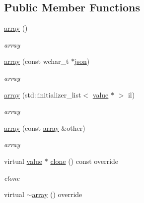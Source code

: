 \subsection*{Public Member Functions}
\begin{DoxyCompactItemize}
\item 
\hyperlink{classformat_1_1array_ab5ea2ac00086dd223936b1d18aef29fd}{array} ()\hypertarget{classformat_1_1array_ab5ea2ac00086dd223936b1d18aef29fd}{}\label{classformat_1_1array_ab5ea2ac00086dd223936b1d18aef29fd}

\begin{DoxyCompactList}\small\item\em array \end{DoxyCompactList}\item 
\hyperlink{classformat_1_1array_a17817a681d45278e357b4b0cabef3316}{array} (const wchar\+\_\+t $\ast$\hyperlink{classformat_1_1json}{json})
\begin{DoxyCompactList}\small\item\em array \end{DoxyCompactList}\item 
\hyperlink{classformat_1_1array_a305e57c21dfe05d3485a4b35d9123f73}{array} (std\+::initializer\+\_\+list$<$ \hyperlink{classformat_1_1value_aa6b85823936bf7b8ab78d3f8d443c00d}{value} $\ast$ $>$ il)
\begin{DoxyCompactList}\small\item\em array \end{DoxyCompactList}\item 
\hyperlink{classformat_1_1array_a3b00ec06a3a2e09905bceb7a1e9e2c3f}{array} (const \hyperlink{classformat_1_1array}{array} \&other)
\begin{DoxyCompactList}\small\item\em array \end{DoxyCompactList}\item 
virtual \hyperlink{classformat_1_1value_aa6b85823936bf7b8ab78d3f8d443c00d}{value} $\ast$ \hyperlink{classformat_1_1array_a456f53d9b5049e9af8d28b9588fc61c4}{clone} () const override
\begin{DoxyCompactList}\small\item\em clone \end{DoxyCompactList}\item 
virtual \hyperlink{classformat_1_1array_ac76e280a41976ee0e862d43118298968}{$\sim$array} () override\hypertarget{classformat_1_1array_ac76e280a41976ee0e862d43118298968}{}\label{classformat_1_1array_ac76e280a41976ee0e862d43118298968}


\end{DoxyCompactItemize}
